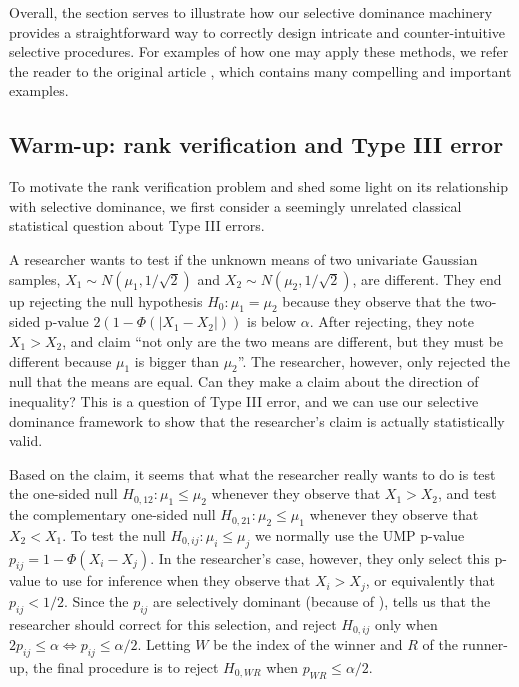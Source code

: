 \documentclass{article}
\begin{document}
Overall, the section serves to illustrate how our selective dominance machinery provides a straightforward way to correctly design intricate and counter-intuitive selective procedures. For examples of how one may apply these methods, we refer the reader to the original article \cite{Hung2019}, which contains many compelling and important examples. 

\subsection{Warm-up: rank verification and Type III error}

To motivate the rank verification problem and shed some light on its relationship with selective dominance, we first consider a seemingly unrelated classical statistical question about Type III errors. 

A researcher wants to test if the unknown means of two univariate Gaussian samples, $X_1 \sim N(\mu_1, 1/\sqrt{2})$ and $X_2 \sim N(\mu_2, 1/\sqrt{2})$, are different. They end up rejecting the null hypothesis $H_0: \mu_1 = \mu_2$ because they observe that the two-sided p-value $2(1 - \Phi(|X_1 - X_2|))$ is below $\alpha$. After rejecting, they note $X_1 > X_2$, and claim ``not only are the two means are different, but they must be different because $\mu_1$ is bigger than $\mu_2$''. The researcher, however, only rejected the null that the means are equal. Can they make a claim about the direction of inequality? This is a question of Type III error, and we can use our selective dominance framework to show that the researcher's claim is actually statistically valid. 

Based on the claim, it seems that what the researcher really wants to do is test the one-sided null $H_{0, 12} : \mu_1 \leq \mu_2$ whenever they observe that $X_1 > X_2$, and test the complementary one-sided null $H_{0, 21} : \mu_2 \leq \mu_1$ whenever they observe that $X_2 < X_1$. To test the null $H_{0, ij} : \mu_i \leq \mu_j$ we normally use the UMP p-value $p_{ij} = 1 - \Phi(X_i - X_j)$. In the researcher's case, however, they only select this p-value to use for inference when they observe that $X_i > X_{j}$, or equivalently that $p_{ij} < 1/2$. Since the $p_{ij}$ are selectively dominant (because of ),  tells us that the researcher should correct for this selection, and reject $H_{0, ij}$ only when $2p_{ij} \leq \alpha \iff p_{ij} \leq \alpha/2$. Letting $W$ be the index of the winner and $R$ of the runner-up, the final procedure is to reject $H_{0, WR}$ when $p_{WR} \leq \alpha/2$. 
\end{document}

